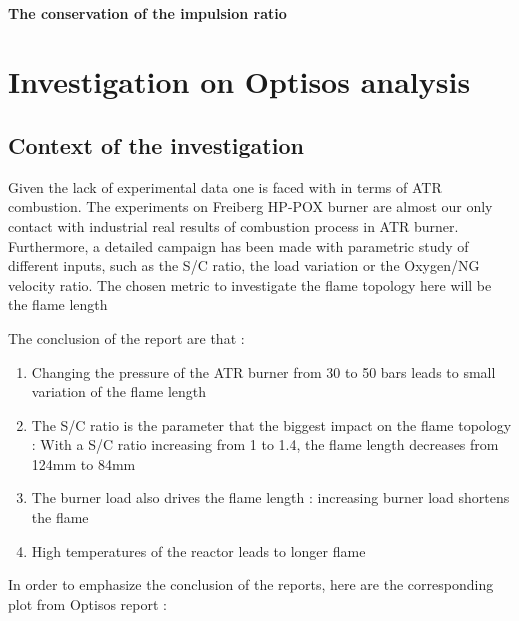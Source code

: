 \paragraph{The conservation of the impulsion ratio}
\newpage

\section{Investigation on Optisos analysis }

\subsection{Context of the investigation}

Given the lack of experimental data one is faced with in terms of ATR combustion. The experiments on Freiberg HP-POX burner are almost our only contact with industrial real results of combustion process in ATR burner. Furthermore, a detailed campaign has been made with parametric study of different inputs, such as the S/C ratio, the load variation or the Oxygen/NG velocity ratio. The chosen metric to investigate the flame topology here will be the flame length 

The conclusion of the report are that :
\begin{enumerate}
\item Changing the pressure of the ATR burner from 30 to 50 bars leads to small variation of the flame length
\item The S/C ratio is the parameter that the biggest impact on the flame topology : With a S/C ratio increasing from 1 to 1.4, the flame length decreases from 124mm to 84mm
\item The burner load also drives the flame length : increasing burner load shortens the flame
\item High temperatures of the reactor leads to longer flame
\end{enumerate}

In order to emphasize the conclusion of the reports, here are the corresponding plot from Optisos report :

